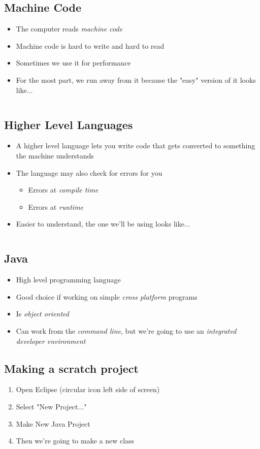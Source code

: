 \documentclass[
paper=128mm:96mm,
fontsize=12pt,
pagesize,
parskip=half-,
]{scrartcl}
\newcommand{\slide}[1]{#1 \clearpage}
\newcommand{\subsectionslide}[2]{\vspace*{1em}\slide{\subsection{#1} #2}}
\begin{document}
	\subsectionslide{Machine Code}
	{
		\begin{itemize}
			\item The computer reads \textit{machine code}
			\item Machine code is hard to write and hard to read
			\item Sometimes we use it for performance
			\item For the most part, we run away from it because the "easy" version of it looks like...
		\end{itemize}	
	}
	
	\slide
	{
		\begin{footnotesize}
		\inputminted{nasm}{code-snippets/helloworld.nasm}
		\end{footnotesize}

	}
	
	\subsectionslide{Higher Level Languages}
	{
		\begin{itemize}
			\item A higher level language lets you write code that gets converted to something the machine understands
			\item The language may also check for errors for you
			\begin{itemize}
				\item Errors at \textit{compile time}
				\item Errors at \textit{runtime}
			\end{itemize}
			\item Easier to understand, the one we'll be using looks like...
		\end{itemize}
	}

	\slide
	{
		\vspace*{2em}
		\inputminted{java}{code-snippets/helloworld.java}
	}
	
	\subsectionslide{Java}
	{
		\begin{itemize}
			\item High level programming language
			\item Good choice if working on simple \textit{cross platform} programs
			\item Is \textit{object oriented}
			\item Can work from the \textit{command line}, but we're going to use an \textit{integrated developer environment}
		\end{itemize}
	}
	
	\subsectionslide{Making a scratch project}
	{
		\begin{enumerate}
			\item Open Eclipse (circular icon left side of screen)
			\item Select "New Project..."
			\item Make New Java Project
			\item Then we're going to make a new class
		\end{enumerate}
	}
	
\end{document}
